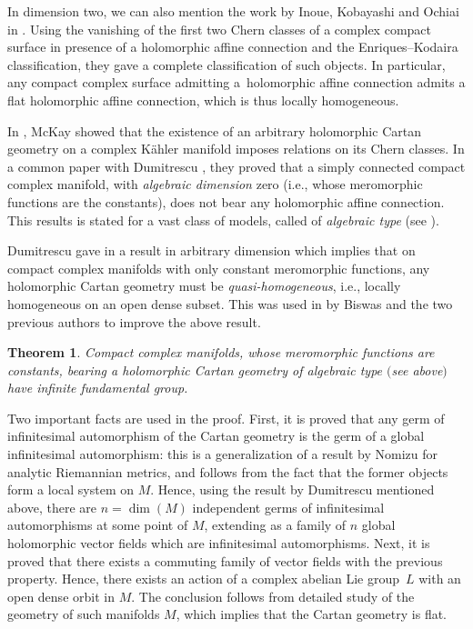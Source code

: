 \documentclass[10pt,a4paper]{amsart}
\numberwithin{equation}{section}
\newtheorem{Theorem}{Theorem}[section]
\begin{document}
 In dimension two, we can also mention the work by Inoue, Kobayashi and Ochiai in \cite{InoueKobayashi}. Using the vanishing of the first two Chern classes of a complex compact surface in presence of a holomorphic affine connection and the Enriques--Kodaira classification, they gave a complete classification of such objects. In particular, any compact complex surface admitting a~holomorphic affine connection admits a flat holomorphic affine connection, which is thus locally homogeneous.

In \cite{McKay}, McKay showed that the existence of an arbitrary holomorphic Cartan geometry on a complex K\"ahler manifold imposes relations on its Chern classes. In a common paper with Dumitrescu \cite{BD}, they proved that a simply connected compact complex manifold, with \textit{algebraic dimension} zero (i.e., whose meromorphic functions are the constants), does not bear any holomorphic affine connection. This results is stated for a vast class of models, called of \textit{algebraic type} (see \cite[p.~1]{Dumitrescu1}).

 Dumitrescu gave in \cite{Dumitrescu1} a result in arbitrary dimension which implies that on compact complex manifolds with only constant meromorphic functions, any holomorphic Cartan geometry must be \textit{quasi-homogeneous}, i.e., locally homogeneous on an open dense subset. This was used in \cite{BDM} by Biswas and the two previous authors to improve the above result.

 \begin{Theorem}\label{theoremBDM} Compact complex manifolds, whose meromorphic functions are constants, bearing a holomorphic Cartan geometry of algebraic
type $($see above$)$ have infinite fundamental group.
 \end{Theorem}
Two important facts are used in the proof. First, it is proved that any germ of infinitesimal automorphism of the Cartan geometry is the germ of a global infinitesimal automorphism: this is a generalization of a result by Nomizu \cite{Nomizu} for analytic Riemannian metrics, and follows from the fact that the former objects form a local system on $M$. Hence, using the result by Dumitrescu mentioned above, there are $n=\dim(M)$ independent germs of infinitesimal automorphisms at some point of $M$, extending as a family of $n$ global holomorphic vector fields which are infinitesimal automorphisms. Next, it is proved that there exists a commuting family of vector fields with the previous property. Hence, there exists an action of a complex abelian Lie group~$L$ with an open dense orbit in $M$. The conclusion follows from detailed study of the geometry of such manifolds $M$, which implies that the Cartan geometry is flat.
\end{document}
